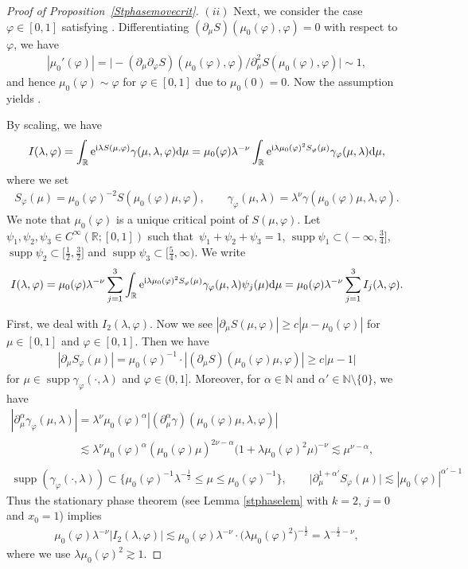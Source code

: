 \documentclass[pdftex]{sigma}
\numberwithin{equation}{section}
\def\R{\mathbb{R}}%
\DeclareMathOperator{\supp}{supp}%
\def\a{\alpha}
\def\c{\gamma}
\def\f{\varphi}
\def\g{\psi}
\def\l{\lambda}
\def\m{\mu}
\def\n{\nu}
\def\pa{\partial}
\begin{document}
\begin{proof}[Proof of Proposition~\ref{Stphasemovecrit}]
 $(ii)$ Next, we consider the case $\f\in [0,1]$ satisfying \smash{$\m_0(\f)\in \bigl[ 2^{-1}\l^{-\frac{1}{2}}, 1\bigr]$}.
Differentiating $(\pa_{\m}S)(\m_0(\f),\f)=0$ with respect to $\f$, we have
\begin{align*}
|\m_0'(\f)|=\bigl|-(\pa_{\m}\pa_{\f}S)(\m_0(\f),\f)/\pa_{\m}^2S(\m_0(\f),\f)\bigr|\sim 1,
\end{align*}
and hence $\m_0(\f)\sim \f$ for $\f\in [0,1]$ due to $\m_0(0)=0$. Now the assumption \smash{$\m_0(\f)\geq 2^{-1}\l^{-\frac{1}{2}}$} yields \smash{$\f\gtrsim \l^{-\frac{1}{2}}$}.

By scaling, we have
\begin{align*}
I(\l,\f)=\int_{\R}{\rm e}^{{\rm i}\l S(\m,\f)}\c(\m,\l,\f){\rm d}\m=\m_0(\f)\l^{-\n}\int_{\R}{\rm e}^{{\rm i}\l \m_0(\f)^2S_{\f}(\m)}\c_{\f}(\m,\l){\rm d}\m,
\end{align*}
where we set
\begin{align*}
S_{\f}(\m)=\m_0(\f)^{-2}S(\m_0(\f)\m,\f),\qquad \c_{\f}(\m,\l)=\l^{\n}\c(\m_0(\f)\m,\l,\f).
\end{align*}
We note that $\m_0(\f)$ is a unique critical point of $S(\m,\f)$.
Let $\g_1,\g_2,\g_3\in C^{\infty}(\R;[0,1])$ such that~${\g_1+\g_2+\g_3=1}$, $\supp \g_1\subset \bigl(-\infty,\frac{3}{4}\bigr]$, $\supp \g_2\subset \bigl[\frac{1}{2},\frac{3}{2}\bigr]$ and $\supp \g_3\subset \bigl[\frac{5}{4},\infty\bigr)$. We write
\begin{align*}
I(\l,\f)
=\m_0(\f)\l^{-\n}\sum_{j=1}^3\int_{\R}{\rm e}^{{\rm i}\l \m_0(\f)^2S_{\f}(\m)}\c_{\f}(\m,\l)\g_j(\m){\rm d}\m
=\m_0(\f)\l^{-\n}\sum_{j=1}^3I_j(\l,\f).
\end{align*}

First, we deal with $I_2(\l,\f)$.
Now we see $|\pa_{\m}S(\m,\f)|\geq c|\m-\m_0(\f)|$ for $\m\in [0,1]$ and $\f\in [0,1]$. Then we have
\begin{align*}
|\pa_{\m}S_{\f}(\m)|=\m_0(\f)^{-1}\cdot |(\pa_{\m}S)(\m_0(\f)\m,\f)|\geq c|\m-1|
\end{align*}
for $\m\in \supp \c_{\f}(\cdot,\l)$ and $\f\in (0,1]$.
Moreover, for $\a\in\mathbb{N}$ and $\a'\in \mathbb{N}\setminus\{0\}$, we have
\begin{gather*}
|\pa_{\m}^{\a}\c_{\f}(\m,\l)|=\l^{\n} \m_0(\f)^{\a}|(\pa_{\m}^{\a}\c)(\m_0(\f)\m,\l,\f)|\\
\phantom{|\pa_{\m}^{\a}\c_{\f}(\m,\l)|}{}\lesssim \l^{\n}\m_0(\f)^{\a} (\m_0(\f) \m)^{2\n-\a}\bigl(1+\l \m_0(\f)^2 \m\bigr)^{-\n}\lesssim \m^{\n-\a},\\
\supp (\c_{\f}(\cdot,\l))\subset \big\{\m_0(\f)^{-1}\l^{-\frac{1}{2}}\leq \m\leq \m_0(\f)^{-1}\big\},\qquad \big|\pa_{\m}^{1+\a'}S_{\f}(\m)\big|\lesssim |\m_0(\f)|^{\a'-1}
\end{gather*}
Thus the stationary phase theorem (see Lemma \ref{stphaselem} with $k=2$, $j=0$ and $x_0=1$) implies
\begin{align*}
\m_0(\f)\l^{-\n}|I_2(\l,\f)|
\lesssim \m_0(\f)\l^{-\n}\cdot \bigl(\l \m_0(\f)^2\bigr)^{-\frac{1}{2}}=\l^{-\frac{1}{2}-\n},
\end{align*}
where we use $\l \m_0(\f)^2\gtrsim 1$.


\end{proof}
\end{document}
